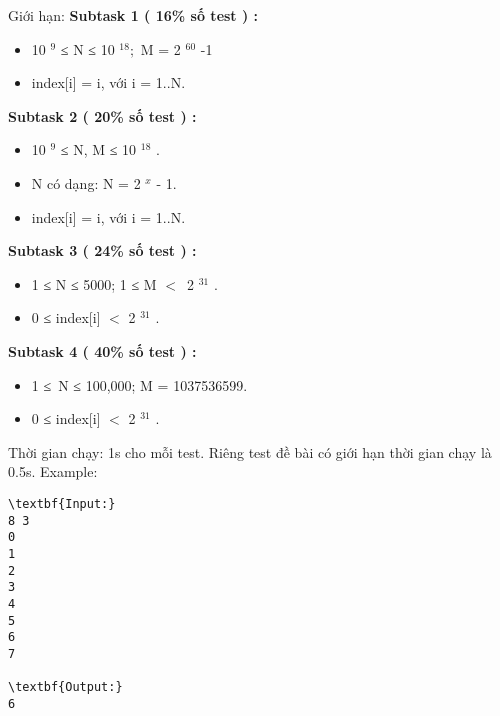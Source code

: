 Giới hạn:
\textbf{Subtask 1 ( 16\% số test ) : }
\begin{itemize}
	\item 

10 $^ 9 $ ≤ N ≤ 10 $^ 18; $ M = 2 $^ 60 $ -1
	\item 

index[i] = i, với i = 1..N.
\end{itemize}

\textbf{Subtask 2 ( 20\% số test ) : }
\begin{itemize}
	\item 

10 $^ 9 $ ≤ N, M ≤ 10 $^ 18 $ .
	\item 

N có dạng: N = 2 $^ x $ - 1.
	\item 

index[i] = i, với i = 1..N.
\end{itemize}

\textbf{Subtask 3 ( 24\% số test ) : }
\begin{itemize}
	\item 

1 ≤ N ≤ 5000; 1 ≤ M $<$ 2 $^ 31 $ .
	\item 

0 ≤ index[i] $<$ 2 $^ 31 $ .
\end{itemize}

\textbf{Subtask 4 ( 40\% số test ) : }
\begin{itemize}
	\item 

1 ≤ N ≤ 100,000; M = 1037536599.
	\item 

0 ≤ index[i] $<$ 2 $^ 31 $ .
\end{itemize}

Thời gian chạy: 1s cho mỗi test. Riêng test đề bài có giới hạn thời gian chạy là 0.5s.
Example:
\begin{verbatim}
\textbf{Input:}
8 3
0
1
2
3
4
5
6
7

\textbf{Output:}
6
\end{verbatim}